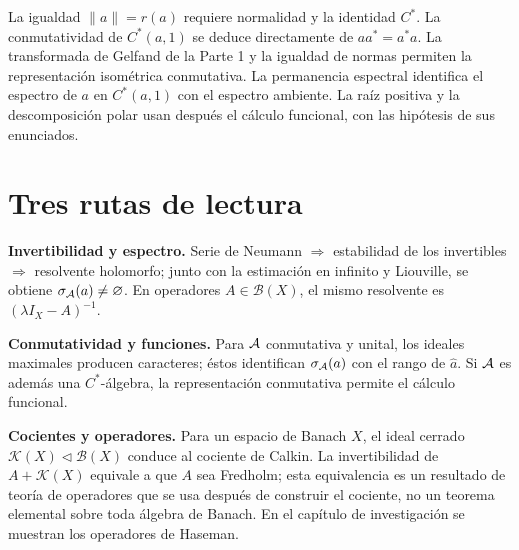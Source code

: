 \begin{center}
\end{center}

La igualdad $\|a\|=r(a)$ requiere normalidad y la identidad $C^*$.
La conmutatividad de $C^*(a,1)$ se deduce directamente de
$aa^*=a^*a$. La transformada de Gelfand de la Parte 1 y la igualdad de
normas permiten la representación isométrica conmutativa. La permanencia
espectral identifica el espectro de $a$ en $C^*(a,1)$ con el espectro
ambiente. La raíz positiva y la descomposición polar usan después el cálculo
funcional, con las hipótesis de sus enunciados.

\section{Tres rutas de lectura}

\noindent\textbf{Invertibilidad y espectro.} Serie de Neumann $\Rightarrow$ estabilidad de los invertibles
$\Rightarrow$ resolvente holomorfo; junto con la estimación en infinito y Liouville, se obtiene
$\sigma_{\mathcal A}(a)\neq\varnothing$. En operadores $A\in\mathcal B(X)$, el mismo resolvente es
$(\lambda I_X-A)^{-1}$.

\noindent\textbf{Conmutatividad y funciones.} Para $\mathcal A$ conmutativa y unital, los ideales maximales
producen caracteres; éstos identifican $\sigma_{\mathcal A}(a)$ con el rango de $\widehat a$. Si $\mathcal A$
es además una $C^*$-álgebra, la representación conmutativa permite el cálculo funcional.

\noindent\textbf{Cocientes y operadores.} Para un espacio de Banach $X$, el ideal cerrado
$\mathcal K(X)\triangleleft\mathcal B(X)$ conduce al cociente de Calkin. La invertibilidad de
$A+\mathcal K(X)$ equivale a que $A$ sea Fredholm; esta equivalencia es un resultado de teoría de
operadores que se usa después de construir el cociente, no un teorema elemental sobre toda
álgebra de Banach. En el capítulo de investigación se muestran los operadores de Haseman.
